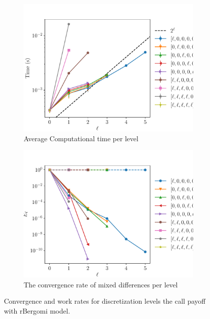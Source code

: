\documentclass[11pt]{article}
\begin{document}
\begin{figure}[!h]
	\centering
	\begin{subfigure}{.5\textwidth}
		\centering
		\includegraphics[width=0.95\linewidth]{./figures/rbergomi_4_steps_K_e__4/level_work.pdf}
		\caption{Average Computational time per level}
		\label{fig:misc_rbergomi_4_steps_sub3}
	\end{subfigure}%
	\begin{subfigure}{.5\textwidth}
		\centering
		\includegraphics[width=0.95\linewidth]{./figures/rbergomi_4_steps_K_e__4/levels_error_rate.pdf}
		\caption{  The convergence rate of mixed differences per level}
		\label{fig:misc_rbergomi_4_steps_sub4}
	\end{subfigure}%
	\caption{Convergence and work rates for discretization levels  the call payoff with rBergomi model.}
	\label{fig:misc_rbergomi_4_steps_2}
\end{figure}
\newpage
\end{document}
